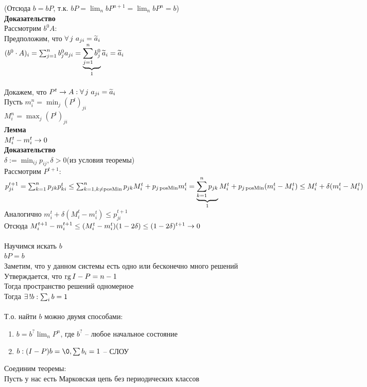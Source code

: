 \documentclass[12pt]{article}
\begin{document}
(Отсюда $b = bP$, т.к. $bP = \lim_n bP^{n+1} = \lim_n bP^n = b$)\\
\textbf{Доказательство}\\
Рассмотрим $b^0A$:\\
Предположим, что $\fall j\ a_{ji} = \ot a_i$\\
$(b^0\cdot A)_i = \sum_{j=1}^n b^0_j a_{ji} = \ub{1}{\sum_{j=1}^n b^0_j}\ot a_i = \ot a_i$\\\\
Докажем, что $P^t \rto A: \fall j\ a_{ji} = \ot a_i$\\
Пусть $m_i^n = \min_j (P^t)_{ji}$\\
$M^n_i = \max_j (P^t)_{ji}$\\
\textbf{Лемма}\\
$M^t_i -m^t_i \rto 0$\\
\textbf{Доказательство}\\
$\delta := \min_{ij}p_{ij}, \delta > 0$(из условия теоремы)\\
Рассмотрим $P^{t+1}$:\\
$p^{t+1}_{ji} = \sum_{k=1}^n p_{jk}p_{ki}^t \leq \sum_{k=1, k\neq \nm{posMin}}^n p_{jk}M_i^t + p_{j\nm{posMin}}m_i^t = \ub{1}{\sum_{k=1}^n p_{jk}}M_i^t + p_{j\nm{posMin}}(m_i^t-M_i^t) \leq M_i^t + \delta(m_i^t-M_i^t)$\\
Аналогично $m_i^t + \delta (M^t_i - m_i^t) \leq p_{ji}^{t+1}$\\
Отсюда $M^{t+1}_i - m^{t+1}_i \leq (M_i^t-m_i^t)(1-2\delta) \leq (1-2\delta)^{t+1} \rto 0$\\\\
Научимся искать $b$\\
$bP=b$\\
Заметим, что у данном системы есть одно или бесконечно много решений\\
Утверждается, что $\rg I-P = n-1$\\
Тогда пространство решений одномерное\\
Тогда $\ex! b: \sum_i b = 1$\\\\
Т.о. найти $b$ можно двумя способами:
\begin{enumerate}
    \item $b = b^?\lim_n P^n$, где $b^?$ -- любое начальное состояние
    \item $b: (I-P)b = \0, \sum b_i = 1$ -- СЛОУ
\end{enumerate}
Соединим теоремы:\\
Пусть у нас есть Марковская цепь без периодических классов\\
\end{document}
